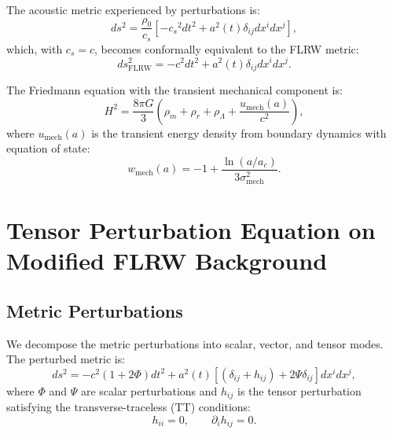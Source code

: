 \documentclass[11pt,a4paper]{article}
\newcommand{\cs}{\ensuremath{c_s}}
\newcommand{\umech}{\ensuremath{u_{\mathrm{mech}}}}
\newcommand{\wmech}{\ensuremath{w_{\mathrm{mech}}}}
\theoremstyle{definition}
\theoremstyle{remark}
\begin{document}
The acoustic metric experienced by perturbations is:
\begin{equation}
\label{eq:acoustic_metric}
ds^2 = \frac{\rho_0}{\cs}\left[-\cs^2 dt^2 + a^2(t)\delta_{ij}dx^i dx^j\right],
\end{equation}
which, with $\cs = c$, becomes conformally equivalent to the FLRW metric:
\begin{equation}
\label{eq:flrw_metric}
ds^2_{\mathrm{FLRW}} = -c^2 dt^2 + a^2(t)\delta_{ij}dx^i dx^j.
\end{equation}

The Friedmann equation with the transient mechanical component is:
\begin{equation}
\label{eq:friedmann_modified}
H^2 = \frac{8\pi G}{3}\left(\rho_m + \rho_r + \rho_\Lambda + \frac{\umech(a)}{c^2}\right),
\end{equation}
where $\umech(a)$ is the transient energy density from boundary dynamics with equation of state:
\begin{equation}
\label{eq:wmech}
\wmech(a) = -1 + \frac{\ln(a/a_c)}{3\sigma_{\mathrm{mech}}^2}.
\end{equation}

\section{Tensor Perturbation Equation on Modified FLRW Background}
\label{sec:tensor_perturbation}

\subsection{Metric Perturbations}
\label{sec:metric_perturbations}

We decompose the metric perturbations into scalar, vector, and tensor modes. The perturbed metric is:
\begin{equation}
\label{eq:perturbed_metric}
ds^2 = -c^2(1 + 2\Phi)dt^2 + a^2(t)\left[(\delta_{ij} + h_{ij}) + 2\Psi\delta_{ij}\right]dx^i dx^j,
\end{equation}
where $\Phi$ and $\Psi$ are scalar perturbations and $h_{ij}$ is the tensor perturbation satisfying the transverse-traceless (TT) conditions:
\begin{equation}
\label{eq:TT_conditions}
h_{ii} = 0, \qquad \partial_i h_{ij} = 0.
\end{equation}
\end{document}
